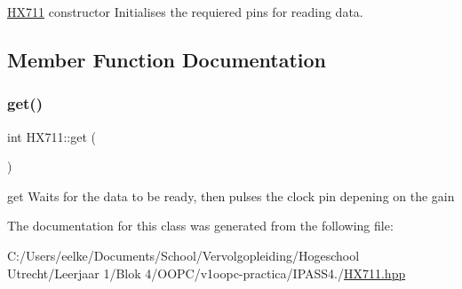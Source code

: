 \hyperlink{class_h_x711}{H\+X711} constructor Initialises the requiered pins for reading data. 



\subsection{Member Function Documentation}
\mbox{\label{class_h_x711_a03141eb216ee53188bf7f16037186c65}} 
\subsubsection{\texorpdfstring{get()}{get()}}
{\footnotesize\ttfamily int H\+X711\+::get (\begin{DoxyParamCaption}{ }\end{DoxyParamCaption})\hspace{0.3cm}{\ttfamily [inline]}}



get Waits for the data to be ready, then pulses the clock pin depening on the gain 



The documentation for this class was generated from the following file\+:\begin{DoxyCompactItemize}
\item 
C\+:/\+Users/eelke/\+Documents/\+School/\+Vervolgopleiding/\+Hogeschool Utrecht/\+Leerjaar 1/\+Blok 4/\+O\+O\+P\+C/v1oopc-\/practica/\+I\+P\+A\+S\+S4./\hyperlink{_h_x711_8hpp}{H\+X711.\+hpp}\end{DoxyCompactItemize}
